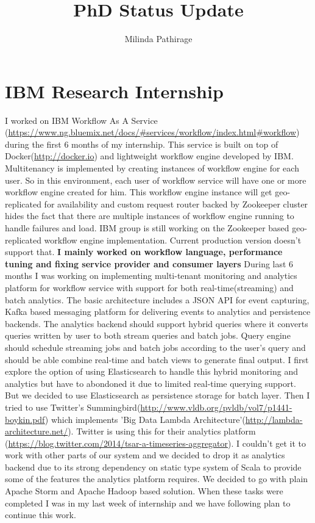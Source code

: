 \documentclass{article}
\begin{document}
\title{PhD Status Update}
\author{Milinda Pathirage}

\maketitle

\section{IBM Research Internship}

I worked on IBM Workflow As A Service
(\url{https://www.ng.bluemix.net/docs/#services/workflow/index.html#workflow})
during the first 6 months of my internship. This service is built on
top of Docker(\url{http://docker.io}) and lightweight workflow engine
developed by IBM. Multitenancy is implemented by creating instances of
workflow engine for each user. So in this environment, each user of
workflow service will have one or more workflow engine created for
him. This workflow engine instance will get geo-replicated for
availability and custom request router backed by Zookeeper cluster
hides the fact that there are multiple instances of workflow engine
running to handle failures and load. IBM group is still working on the
Zookeeper based geo-replicated workflow engine implementation. Current
production version doesn't support that. \textbf{I mainly worked on workflow
language, performance tuning and fixing service provider and consumer
layers}
During last 6 months I was working on implementing multi-tenant
monitoring and analytics platform for workflow service with support
for both real-time(streaming) and batch analytics. The basic
architecture includes a JSON API for event capturing, Kafka based
messaging platform for delivering events to analytics and persistence
backends. The analytics backend should support hybrid queries where it
converts queries written by user to both stream queries and batch
jobs. Query engine should schedule streaming jobs and batch jobs
according to the user's query and should be able combine real-time and
batch views to generate final output. I first explore the option of
using Elasticsearch to handle this hybrid monitoring and analytics but
have to abondoned it due to limited real-time querying support. But we
decided to use Elasticsearch as persistence storage for batch
layer. Then I tried to use Twitter's
Summingbird(\url{http://www.vldb.org/pvldb/vol7/p1441-boykin.pdf})
which implements 'Big Data Lambda
Architecture'(\url{http://lambda-architecture.net/}). Twitter is using
this for their analytics platform
(\url{https://blog.twitter.com/2014/tsar-a-timeseries-aggregator}).
I couldn't get it to work with other parts of our system and we
decided to drop it as analytics backend due to its
strong dependency on static type system of Scala to provide some of
the features the analytics platform requires. We decided to go with
plain Apache Storm and Apache Hadoop based solution. When these tasks
were completed I was in my last week of internship and we have
following plan to continue this work.
\end{document}
